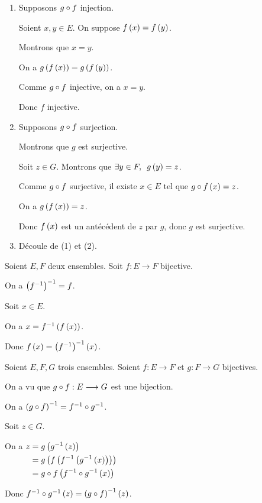 \begin{dem}
\begin{enumerate}
\item Supposons \(g\circ f\) injection.

Soient \(x,y\in E\). On suppose \(f\left(x\right)=f\left(y\right)\).

Montrons que \(x=y\).

On a \(g\left(f\left(x\right)\right)=g\left(f\left(y\right)\right)\).

Comme \(g\circ f\) injective, on a \(x=y\).

Donc \(f\) injective.

\item Supposons \(g\circ f\) surjection.

Montrons que \(g\) est surjective.

Soit \(z\in G\). Montrons que \(\quantifs{\exists y\in F}g\paren{y}=z\).

Comme \(g\circ f\) surjective, il existe \(x\in E\) tel que \(g\circ f\left(x\right)=z\).

On a \(g\left(f\left(x\right)\right)=z\).

Donc \(f\left(x\right)\) est un antécédent de \(z\) par \(g\), donc \(g\) est surjective.

\item Découle de (1) et (2).
\end{enumerate}
\end{dem}

\begin{oubli}
Soient \(E,F\) deux ensembles. Soit \(f:E\to F\) bijective.

On a \(\left(f^{-1}\right)^{-1}=f\).
\end{oubli}

\begin{dem}
Soit \(x\in E\).

On a \(x=f^{-1}\left(f\left(x\right)\right)\).

Donc \(f\left(x\right)=\left(f^{-1}\right)^{-1}\left(x\right)\).
\end{dem}

\begin{prop}
Soient \(E,F,G\) trois ensembles. Soient \(f:E\to F\) et \(g:F\to G\) bijectives.

On a vu que \(g\circ f:E\longrightarrow G\) est une bijection.

On a \(\left(g\circ f\right)^{-1}=f^{-1}\circ g^{-1}\).
\end{prop}

\begin{dem}
Soit \(z\in G\).

On a \(\begin{aligned}[t]
z&=g\left(g^{-1}\left(z\right)\right) \\
&=g\left(f\left(f^{-1}\left(g^{-1}\left(x\right)\right)\right)\right) \\
&=g\circ f\left(f^{-1}\circ g^{-1}\left(x\right)\right)
\end{aligned}\)

Donc \(f^{-1}\circ g^{-1}\left(z\right)=\left(g\circ f\right)^{-1}\left(z\right)\).
\end{dem}

